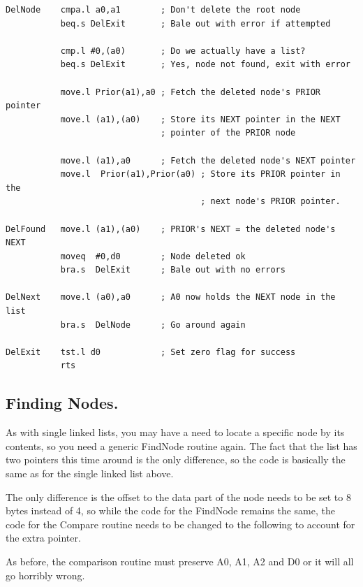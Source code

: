 \begin{lstlisting}[firstnumber=last,caption={Deleting a Node},label={lst:DeletingANode2}]
DelNode    cmpa.l a0,a1        ; Don't delete the root node
           beq.s DelExit       ; Bale out with error if attempted

           cmp.l #0,(a0)       ; Do we actually have a list?
           beq.s DelExit       ; Yes, node not found, exit with error

           move.l Prior(a1),a0 ; Fetch the deleted node's PRIOR pointer
           move.l (a1),(a0)    ; Store its NEXT pointer in the NEXT
                               ; pointer of the PRIOR node

           move.l (a1),a0      ; Fetch the deleted node's NEXT pointer
           move.l  Prior(a1),Prior(a0) ; Store its PRIOR pointer in the
                                       ; next node's PRIOR pointer.

DelFound   move.l (a1),(a0)    ; PRIOR's NEXT = the deleted node's NEXT
           moveq  #0,d0        ; Node deleted ok
           bra.s  DelExit      ; Bale out with no errors

DelNext    move.l (a0),a0      ; A0 now holds the NEXT node in the list
           bra.s  DelNode      ; Go around again

DelExit    tst.l d0            ; Set zero flag for success
           rts
\end{lstlisting}

\subsection{Finding Nodes.}
\label{ch10-dbl-finding-nodes}%

As with single linked lists, you may have a need to locate a
      specific node by its contents, so you need a generic FindNode routine
      again. The fact that the list has two pointers this time around is the
      only difference, so the code is basically the same as for the single
      linked list above.

The only difference is the offset to the data part of the node
      needs to be set to 8 bytes instead of 4, so while the code for the
      FindNode remains the same, the code for the Compare routine needs to be
      changed to the following to account for the extra pointer.

As before, the comparison routine must preserve A0, A1, A2 and D0
      or it will all go horribly wrong.

